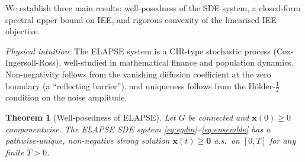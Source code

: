 \documentclass[review,12pt]{elsarticle}
\newcommand{\bfx}{\mathbf{x}}
\newtheorem{theorem}{Theorem}
\begin{document}
We establish three main results: well-posedness of the SDE system, a
closed-form spectral upper bound on IEE, and rigorous convexity of the
linearised IEE objective.

\noindent\emph{Physical intuition}: The ELAPSE system is a
CIR-type stochastic process (Cox-Ingersoll-Ross), well-studied in
mathematical finance and population dynamics.  Non-negativity follows from
the vanishing diffusion coefficient at the zero boundary (a ``reflecting
barrier''), and uniqueness follows from the H\"{o}lder-$\frac{1}{2}$
condition on the noise amplitude.

\begin{theorem}[Well-posedness of ELAPSE]
\label{thm:wellposed}
Let $G$ be connected and $\bfx(0) \geq 0$ componentwise.
The ELAPSE SDE system \eqref{eq:egdm}--\eqref{eq:ensemble} has a
pathwise-unique, non-negative strong solution $\bfx(t) \geq \mathbf{0}$
a.s.\ on $[0,T]$ for any finite $T > 0$.
\end{theorem}
\end{document}
